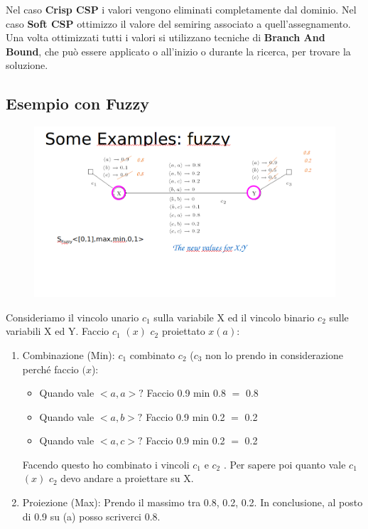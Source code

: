 Nel caso \textbf{Crisp CSP} i valori vengono eliminati completamente dal
dominio. Nel caso \textbf{Soft CSP} ottimizzo il valore del semiring associato a
quell'assegnamento. Una volta ottimizzati tutti i valori si utilizzano tecniche
di \textbf{Branch And Bound}, che può essere applicato o all'inizio o durante la
ricerca, per trovare la soluzione.

\subsection{Esempio con Fuzzy}
\begin{figure}[htp]
    \centering
    \includegraphics[width=14cm, keepaspectratio]{img/Cap5/ffuzzy2.png}
\end{figure}
Consideriamo il vincolo unario $c_1$ sulla variabile X ed il vincolo binario $c_2$
sulle variabili X ed Y. Faccio $c_1$ $(x)$ $c_2$ proiettato $x(a)$:
\begin{enumerate}
    \item Combinazione (Min): $c_1$ combinato $c_2$ ($c_3$ non lo prendo in
          considerazione perché faccio $(x$):
          \begin{itemize}
              \item Quando vale $< a, a >?$ Faccio 0.9 min 0.8 $=$ 0.8
              \item Quando vale $< a, b >?$ Faccio 0.9 min 0.2 $=$ 0.2
              \item Quando vale $< a, c >?$ Faccio 0.9 min 0.2 $=$ 0.2
          \end{itemize}
          Facendo questo ho combinato i vincoli $c_1$ e $c_2$ . Per sapere poi quanto
          vale $c_1$ $(x)$ $c_2$ devo andare a proiettare su X.
    \item Proiezione (Max): Prendo il massimo tra 0.8, 0.2, 0.2. In conclusione,
          al posto di 0.9 su (a) posso scriverci 0.8.
\end{enumerate}
